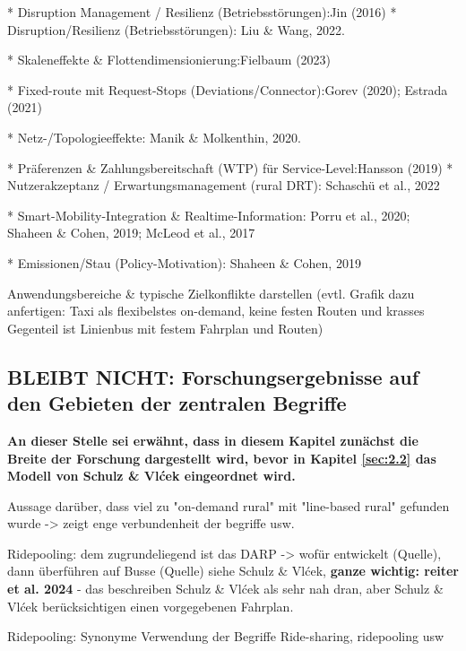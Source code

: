 * Disruption Management / Resilienz (Betriebsstörungen):Jin (2016)
* Disruption/Resilienz (Betriebsstörungen): Liu \& Wang, 2022.




* Skaleneffekte \& Flottendimensionierung:Fielbaum (2023)



* Fixed-route mit Request-Stops (Deviations/Connector):Gorev (2020); Estrada (2021)



* Netz-/Topologieeffekte: Manik \& Molkenthin, 2020.

* Präferenzen \& Zahlungsbereitschaft (WTP) für Service-Level:Hansson (2019)
* Nutzerakzeptanz / Erwartungsmanagement (rural DRT): Schaschü et al., 2022

* Smart-Mobility-Integration \& Realtime-Information: Porru et al., 2020; Shaheen \& Cohen, 2019; McLeod et al., 2017



* Emissionen/Stau (Policy-Motivation): Shaheen \& Cohen, 2019


Anwendungsbereiche \& typische Zielkonflikte darstellen (evtl. Grafik dazu anfertigen: Taxi als flexibelstes on-demand, keine festen Routen und krasses Gegenteil ist Linienbus mit festem Fahrplan und Routen)

\subsection{BLEIBT NICHT: Forschungsergebnisse auf den Gebieten der zentralen Begriffe}


\textbf{An dieser Stelle sei erwähnt, dass in diesem Kapitel zunächst die Breite der Forschung dargestellt wird, bevor in Kapitel \ref{sec:2.2} das Modell von Schulz \& Vlćek eingeordnet wird.}

Aussage darüber, dass viel zu "on-demand rural" mit "line-based rural" gefunden wurde -> zeigt enge verbundenheit der begriffe usw.


Ridepooling: dem zugrundeliegend ist das DARP -> wofür entwickelt (Quelle), dann überführen auf Busse (Quelle) siehe Schulz \& Vlćek, \textbf{ganze wichtig: reiter et al. 2024} - das beschreiben Schulz \& Vlćek als sehr nah dran, aber Schulz \& Vlćek berücksichtigen einen vorgegebenen Fahrplan. 

Ridepooling: Synonyme Verwendung der Begriffe Ride-sharing, ridepooling usw


